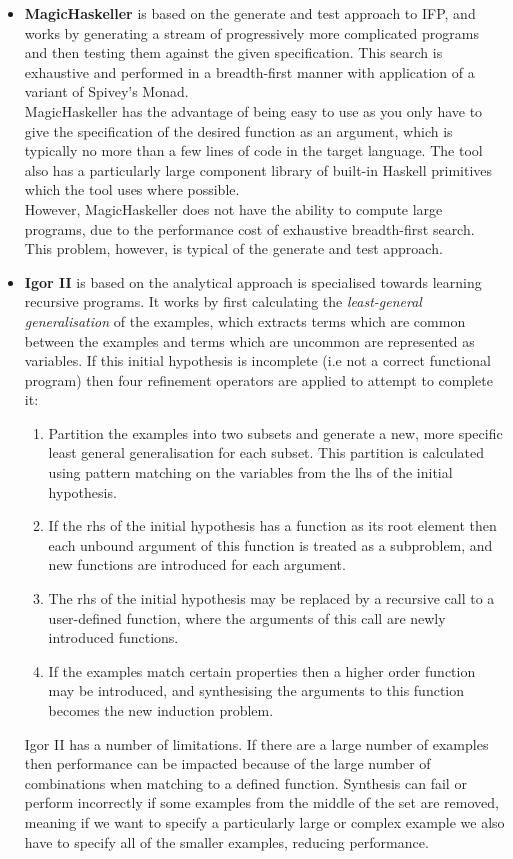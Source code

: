 \begin{itemize}
\item \textbf{MagicHaskeller} is based on the generate and test approach to IFP, and works by generating a stream of progressively more complicated programs and then testing them against the given specification. This search is exhaustive and performed in a breadth-first manner with application of a variant of Spivey's Monad.\\

MagicHaskeller has the advantage of being easy to use as you only have to give the specification of the desired function as an argument, which is typically no more than a few lines of code in the target language. The tool also has a particularly large component library of built-in Haskell primitives which the tool uses where possible.\\

However, MagicHaskeller does not have the ability to compute large programs, due to the performance cost of exhaustive breadth-first search. This problem, however, is typical of the generate and test approach.

\item \textbf{Igor II} is based on the analytical approach is specialised towards learning recursive programs. It works by first calculating the \textit{least-general generalisation} of the examples, which extracts terms which are common between the examples and terms which are uncommon are represented as variables. If this initial hypothesis is incomplete (i.e not a correct functional program) then four refinement operators are applied to attempt to complete it:
\begin{enumerate}
\item Partition the examples into two subsets and generate a new, more specific least general generalisation for each subset. This partition is calculated using pattern matching on the variables from the lhs of the initial hypothesis.
\item If the rhs of the initial hypothesis has a function as its root element then each unbound argument of this function is treated as a subproblem, and new functions are introduced for each argument.
\item The rhs of the initial hypothesis may be replaced by a recursive call to a user-defined function, where the arguments of this call are newly introduced functions.
\item If the examples match certain properties then a higher order function may be introduced, and synthesising the arguments to this function becomes the new induction problem.
\end{enumerate}
Igor II has a number of limitations. If there are a large number of examples then performance can be impacted because of the large number of combinations when matching to a defined function. Synthesis can fail or perform incorrectly if some examples from the middle of the set are removed, meaning if we want to specify a particularly large or complex example we also have to specify all of the smaller examples, reducing performance.
\end{itemize}

